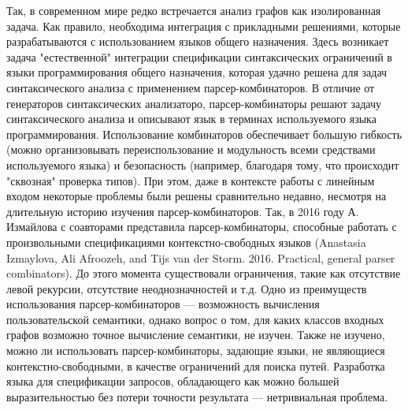 \documentclass[12pt]{article}  %
\theoremstyle{remark}
\begin{document}
Так, в современном мире редко встречается анализ графов как изолированная задача. Как правило, необходима интеграция с прикладными решениями, которые разрабатываются с использованием языков общего назначения. Здесь возникает задача "естественной" интеграции спецификации синтаксических ограничений в языки программирования общего назначения, которая удачно решена для задач синтаксического анализа с применением парсер-комбинаторов. В отличие от генераторов синтаксических анализаторо, парсер-комбинаторы решают задачу синтаксического анализа и описывают язык в терминах используемого языка программирования. Использование комбинаторов обеспечивает большую гибкость (можно организовывать переиспользование и модульность всеми средствами используемого языка) и безопасность (например, благодаря тому, что происходит "сквозная" проверка типов). При этом, даже в контексте работы с линейным входом некоторые проблемы были решены сравнительно недавно, несмотря на длительную историю изучения парсер-комбинаторов. Так, в 2016 году А. Измайлова с соавторами представила парсер-комбинаторы, способные работать с произвольными спецификациями контекстно-свободных языков (Anastasia Izmaylova, Ali Afroozeh, and Tijs van der Storm. 2016. Practical, general parser combinators). До этого момента существовали ограничения, такие как отсутствие левой рекурсии, отсутствие неоднозначностей и т.д. Одно из преимуществ использования парсер-комбинаторов — возможность вычисления пользовательской семантики, однако вопрос о том, для каких классов входных графов возможно точное вычисление семантики, не изучен. Также не изучено, можно ли использовать парсер-комбинаторы, задающие языки, не являющиеся контекстно-свободными, в качестве ограничений для поиска путей. Разработка языка для спецификации запросов, обладающего как можно большей выразительностью без потери точности результата — нетривиальная проблема.
\end{document}
